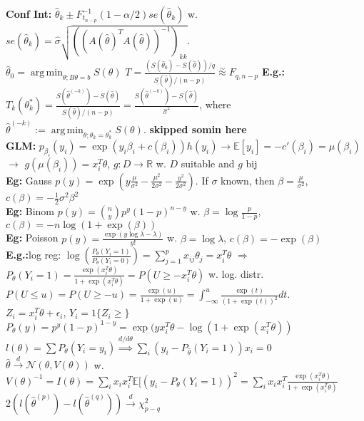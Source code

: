 \documentclass[11pt]{article}
\newcommand{\R}{\mathbb{R}}
\newcommand{\E}{\mathbb{E}}
\DeclareMathOperator*{\argmin}{arg\,min}
\begin{document}
\begin{multicols}{4}
\textbf{Conf Int:} $\hat{\theta}_k\pm F^{-1}_{t_{n-p}}(1-\alpha/2)se(\hat{\theta}_k)$ w. $se(\hat{\theta}_k)=\hat{\sigma}\sqrt{((A(\hat{\theta})^TA(\hat{\theta}))^{-1})_{kk}}
$.\\
$\hat{\theta}_0=\argmin_{\theta;B\theta=b}S(\theta)$ $T=\frac{(S(\hat{\theta}_0)-S(\hat{\theta}))/q}{S(\hat{\theta})/(n-p)}\stackrel{\sim}{\approx}F_{q,n-p}$
\textbf{E.g.:}$T_k(\theta^*_k)=\frac{S(\hat{\theta}^{(-k)})-S(\hat{\theta})}{S(\hat{\theta})/(n-p)}=\frac{S(\hat{\theta}^{(-k)})-S(\hat{\theta})}{\hat{\sigma}^2}$, where $\hat{\theta}^{(-k)}:=\argmin_{\theta;\theta_k=\theta_k^*}S(\theta).$
\textbf{skipped somin here}\\

\textbf{GLM:} $p_{\beta_i}(y_i)=\exp(y_i\beta_i+c(\beta_i))h(y_i)\rightarrow \E[y_i]=-c'(\beta_i)=\mu(\beta_i)$ $\rightarrow$ $g(\mu(\beta_i))=x_i^T\theta$, $g:D\rightarrow\R$ w. $D$ suitable and $g$ bij\\
\textbf{Eg:} Gauss $p(y)=\exp(y\frac{\mu}{\sigma^2}-\frac{\mu^2}{2\sigma^2}-\frac{y^2}{2\sigma^2})$. If $\sigma$ known, then $\beta=\frac{\mu}{\sigma^2}$, $c(\beta)=-\frac{1}{2}\sigma^2\beta^2$\\
\textbf{Eg:} Binom $p(y)=\binom{n}{y}p^y(1-p)^{n-y}$ w. $\beta=\log\frac{p}{1-p}$, $c(\beta)=-n\log(1+\exp(\beta))$\\
\textbf{Eg:} Poisson $p(y)=\frac{\exp(y\log\lambda-\lambda)}{y!}$ w. $\beta=\log\lambda$, $c(\beta)=-\exp(\beta)$\\
\textbf{E.g.:}log reg: $\log(\frac{P_\theta(Y_i=1)}{P_\theta(Y_i=0)})=\sum^p_{j=1}x_{ij}\theta_j=x_i^T\theta$ $\Rightarrow$ $P_\theta(Y_i=1)=\frac{\exp(x_i^T\theta)}{1+\exp(x_i^T\theta)}=P(U\geq-x_i^T\theta)$ w. log. distr. $P(U\leq u)=P(U\geq -u)=\frac{\exp(u)}{1+\exp(u)}=\int^u_{-\infty}\frac{\exp(t)}{(1+\exp(t))^2}dt$.\\
$Z_i=x_i^T\theta+\epsilon_i$, $Y_i=1\{Z_i\geq\}$\\
$P_\theta(y)=p^y(1-p)^{1-y}=\exp(yx_i^T\theta-\log(1+\exp(x_i^T\theta))$\\
$l(\theta)=\sum P_\theta(Y_i=y_i)\stackrel{d/d\theta}{\Rightarrow}\sum_i(y_i-P_{\hat{\theta}}(Y_i=1))x_i=0$\\
$\hat{\theta}\stackrel{d}{\rightarrow}\mathcal{N}(\theta,V(\theta))$ w. $V(\theta)^{-1}=I(\theta)=\sum_i x_ix_i^T \E[(y_i-P_\theta(Y_i=1))^2=\sum_i x_ix_i^T\frac{\exp(x_i^T\theta)}{1+\exp(x_i^T\theta)}$\\
$2(l(\hat{\theta}^{(p)})-l(\hat{\theta}^{(q)}))\stackrel{d}{\rightarrow}\chi^2_{p-q}$\\


\end{multicols}
\end{document}
